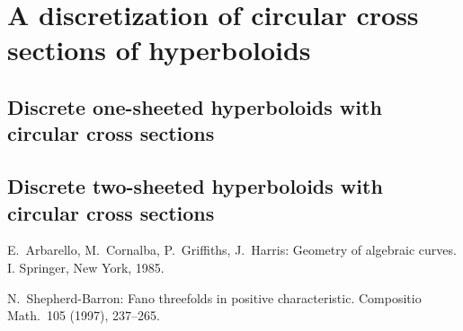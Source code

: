 \documentclass[12pt,a4paper]{article}
\begin{document}
\section{A discretization of circular cross sections of hyperboloids}
\subsection{Discrete one-sheeted hyperboloids with circular cross sections}
\cite{DiscretizationConfocalQuadricsI}
\subsection{Discrete two-sheeted hyperboloids with circular cross sections}
\pagebreak
\begin{thebibliography}{ccccc}

E.\ Arbarello, M.\ Cornalba, P.\ Griffiths, J.\ Harris:
Geometry of algebraic curves. I.
Springer, New York, 1985.

N.\ Shepherd-Barron:
Fano threefolds in positive characteristic.
Compositio Math.\  105  (1997),  237--265.
\end{thebibliography}
\end{document}
